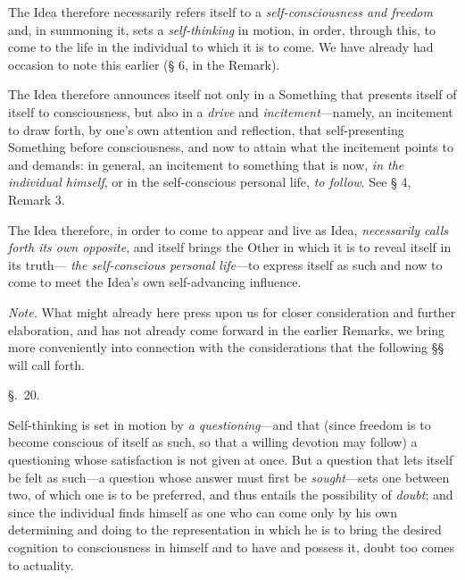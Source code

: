 \documentclass[12pt,a4paper]{book}
\begin{document}
The Idea therefore necessarily refers itself to a \emph{self-consciousness and freedom} and,
in summoning it, sets a \emph{self-thinking} in motion, in order, through this, to come to the
life in the individual to which it is to come. We have already had occasion to note this
earlier (§ 6, in the Remark).

The Idea therefore announces itself not only in a Something that presents itself of itself to
consciousness, but also in a \emph{drive} and \emph{incitement}---namely, an incitement to draw
forth, by one's own attention and reflection, that self-presenting Something before
consciousness, and now to attain what the incitement points to and demands: in general, an
incitement to something that is now, \emph{in the individual himself}, or in the
self-conscious personal life, \emph{to follow}. See § 4, Remark 3.

The Idea therefore, in order to come to appear and live as Idea, \emph{necessarily calls forth
its own opposite}, and itself brings the Other in which it is to reveal itself in its truth---
\emph{the self-conscious personal life}---to express itself as such and now to come to meet the
Idea's own self-advancing influence.

\emph{Note.} What might already here press upon us for closer consideration and further
elaboration, and has not already come forward in the earlier Remarks, we bring more
conveniently into connection with the considerations that the following §§ will call forth.

\begin{center}\large\S.~20.\end{center}
Self-thinking is set in motion by \emph{a questioning}---and that (since freedom is to become
conscious of itself as such, so that a willing devotion may follow) a questioning whose
satisfaction is not given at once. But a question that lets itself be felt as such---a question
whose answer must first be \emph{sought}---sets one between two, of which one is to
be preferred, and thus entails the possibility of \emph{doubt}; and since the individual finds
himself as one who can come only by his own determining and doing to the representation in
which he is to bring the desired cognition to consciousness in himself and to have and possess
it, doubt too comes to actuality.
\end{document}
